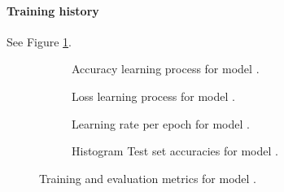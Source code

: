 \documentclass[10pt]{article}
\begin{document}
    \paragraph*{Training history} See Figure \ref{fig:results\VAR{summary['model']['reportnumber']}}.
    \begin{figure}[H]
        \centering
        \begin{subfigure}{.5\textwidth}
            \caption{Accuracy learning process for model \protect\hyperref[training:\VAR{summary['model']['reportnumber']}]
                        {}.}
        \end{subfigure}%
        \hfill%
        \begin{subfigure}{.5\textwidth}
            \caption{Loss learning process for model \protect\hyperref[training:\VAR{summary['model']['reportnumber']}]
                        {}.}
        \end{subfigure}
        \par\bigskip
        \begin{subfigure}{.5\textwidth}
            \caption{Learning rate per epoch for model \protect\hyperref[training:\VAR{summary['model']['reportnumber']}]
                        {}.}
        \end{subfigure}%
        \hfill%
        \begin{subfigure}{.5\textwidth}
            \caption{Histogram Test set accuracies for model
            \protect\hyperref[training:\VAR{summary['model']['reportnumber']}]
                        {}.}
        \end{subfigure}
        \caption{Training and evaluation metrics for model  \protect\hyperref[training:\VAR{summary['model']['reportnumber']}]
                    {}.
                \label{fig:results\VAR{summary['model']['reportnumber']}}}
    \end{figure}
\end{document}
